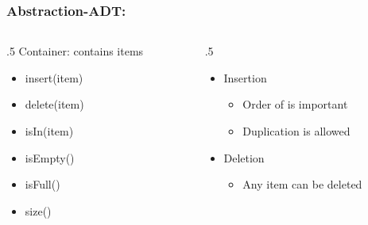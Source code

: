 \documentclass[aspectratio=169,10pt,compress]{beamer}
\begin{document}
\begin{frame}\frametitle{Abstraction-ADT: }
	\begin{columns}[T] %
	\begin{column}{.5\linewidth} %
	    	Container: contains items
		\begin{itemize}
			\item insert(item)
			\item delete(item)
			\item isIn(item)
			\item isEmpty()
			\item isFull()
			\item size()			
		\end{itemize}
	\end{column} %
	\begin{column}{.5\linewidth} %
		\begin{itemize}

			\item
			Insertion
			\begin{itemize}
				\item
				Order of is  important
	
				\item
				Duplication is   allowed
			\end{itemize}

			\item
			Deletion
			\begin{itemize}
				\item
				Any item can be deleted
			\end{itemize}
		\end{itemize}
	\end{column} %
	\end{columns} %
\end{frame}




\end{document}
